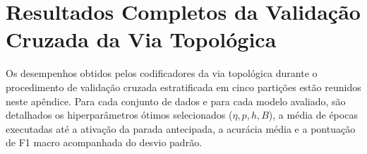 \chapter{Resultados Completos da Validação Cruzada da Via Topológica}
\label{apendice:topologica}

Os desempenhos obtidos pelos codificadores da via topológica durante o procedimento de validação cruzada estratificada em cinco partições estão reunidos neste apêndice. Para cada conjunto de dados e para cada modelo avaliado, são detalhados os hiperparâmetros ótimos selecionados ($\eta, p, h, B$), a média de épocas executadas até a ativação da parada antecipada, a acurácia média e a pontuação de F1 macro acompanhada do desvio padrão.

\begin{table}[H]
\centering
\caption{Desempenho detalhado por validação cruzada (5 partições) e configurações ótimas da via topológica.}
\label{tab:apendice-top}
\footnotesize
{}
\end{table}
